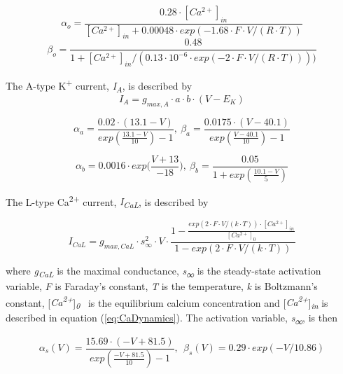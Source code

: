 \documentclass[a4paper,12pt]{article}
\begin{document}
\begin{equation}
\alpha_{o} = \frac{0.28 \cdot[Ca^{2+}]_{in}}{[Ca^{2+}]_{in} + 0.00048	\cdot exp(-1.68 \cdot F \cdot V / (R \cdot T)) }
\end{equation}
\begin{equation}
\beta_{o} = \frac{0.48}{1 + [Ca^{2+}]_{in} / (0.13 \cdot 10^{-6} \cdot exp(-2 \cdot F \cdot V/ (R \cdot T))) )}
\end{equation}

The A-type K\textsuperscript{+} current,
\textit{I}\textit{\textsubscript{A}}, is described by\ \ 
\begin{equation}
I_A=g_{max, A} \cdot a \cdot b  \cdot (V-E_K)
\end{equation}

\begin{equation}
\alpha_a=\frac{0.02\cdot (13.1-V)}{exp(\frac{13.1-V}{10})-1}, \ 
\beta_a=\frac{0.0175  \cdot(V-40.1)}{exp(\frac{V-40.1}{10})-1}
\end{equation}

\begin{equation}
\alpha_b = 0.0016 \cdot exp \Big(\frac{V + 13}{-18} \Big), \  \beta_b=\frac{0.05}{1+exp(\frac{10.1-V}{5})}
\end{equation}

The L-type Ca\textsuperscript{2+} current, \textit{I\textsubscript{CaL}}, is described by


\begin{equation}
I_{CaL}=g_{max, CaL}\cdot s_{\infty }^2\cdot V \cdot
\frac{1-\frac{exp(2 \cdot F \cdot V/ (k \cdot T)) \cdot [Ca^{2+}]_{in}}{[Ca^{2+}]_{0}}} {1-exp(2 \cdot F \cdot V/(k \cdot T))} 
\end{equation}


where \textit{g}\textit{\textsubscript{CaL}} is the maximal conductance, \textit{s}\textsf{\textit{\textsubscript{∞}}}
is the steady-state activation variable, \textit{F} is Faraday’s constant, \textit{T} is the temperature, \textit{k} is
Boltzmann’s constant, [\textit{Ca\textsuperscript{2+}}]\textit{\textsubscript{0}} \ is the equilibrium calcium concentration and [\textit{Ca\textsuperscript{2+}}]\textit{\textsubscript{in}} is
described in equation (\ref{eq:CaDynamics}). The activation variable, \textit{s\textsubscript{∞}}, is then


\begin{equation}
\alpha_s(V) = \frac{15.69\cdot(-V+81.5)}{exp(\frac{-V+81.5}{10})-1} , \ \  
\beta_s(V )= 0.29\cdot exp(-V/10.86)
\end{equation}
\end{document}
